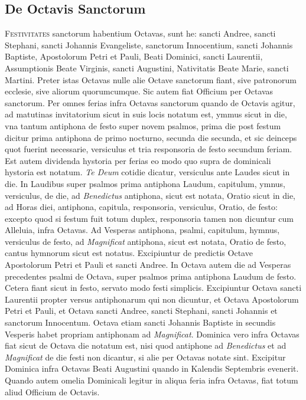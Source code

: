 \documentclass[11pt,openany]{book}
\newcommand*\zallmancaps{\usefont{U}{Zallman}{xl}{n}}
\newcommand{\ubsubsection}[2]{%
	\subsection*{#1}%
	\phantomsection%
	\addcontentsline{toc}{subsection}{#1}%
	\hypertarget{#2}{}%
}
\begin{document}
\begin{multicols*}{2}
{\color{Red} \ubsubsection{De Octavis Sanctorum}{ordinarium-de-octavis-sanctorum}}
\lettrine[lines=2]{\zallmancaps \color{Blue} F}{estivitates} sanctorum habentium Octavas, sunt he: sancti Andree, sancti Stephani, sancti Johannis Evangeliste, sanctorum Innocentium, sancti Johannis Baptiste, Apostolorum Petri et Pauli, Beati Dominici, sancti Laurentii, Assumptionis Beate Virginis, sancti Augustini, Nativitatis Beate Marie, sancti Martini.
Preter istas Octavas nulle alie Octave sanctorum fiant, sive patronorum ecclesie, sive aliorum quorumcumque. Sic autem fiat Officium per Octavas sanctorum.
Per omnes ferias infra Octavas sanctorum quando de Octavis agitur, ad matutinas invitatorium sicut in suis locis notatum est, ymmus sicut in die, vna tantum antiphona de festo super novem psalmos, prima die post festum dicitur prima antiphona de primo nocturno, secunda die secunda, et sic deinceps quot fuerint necessarie, versiculus et tria responsoria de festo secundum feriam. Est autem dividenda hystoria per ferias eo modo quo supra de dominicali hystoria est notatum. \textit{Te Deum} cotidie dicatur, versiculus ante Laudes sicut in die.
In Laudibus super psalmos prima antiphona Laudum, capitulum, ymnus, versiculus, de die, ad \textit{Benedictus} antiphona, sicut est notata, Oratio sicut in die, ad Horas diei, antiphona, capitula, responsoria, versiculus, Oratio, de festo: excepto quod si festum fuit totum duplex, responsoria tamen non dicuntur cum Alleluia, infra Octavas. Ad Vesperas antiphona, psalmi, capitulum, hymnus, versiculus de festo, ad \textit{Magnificat} antiphona, sicut est notata, Oratio de festo, cantus hymnorum sicut est notatus. Excipiuntur de predictis Octave Apostolorum Petri et Pauli et sancti Andree. In Octava autem die ad Vesperas precedentes psalmi de Octava, super psalmos prima antiphona Laudum de festo. Cetera fiant sicut in festo, servato modo festi simplicis. Excipiuntur Octava sancti Laurentii propter versus antiphonarum qui non dicuntur, et Octava Apostolorum Petri et Pauli, et Octava sancti Andree, sancti Stephani, sancti Johannis et sanctorum Innocentum.
Octava etiam sancti Johannis Baptiste in secundis Vesperis habet propriam antiphonam ad \textit{Magnificat}. Dominica vero infra Octavas fiat sicut de Octava die notatum est, nisi quod antiphone ad \textit{Benedictus} et ad \textit{Magnificat} de die festi non dicantur, si alie per Octavas notate sint. Excipitur Dominica infra Octavas Beati Augustini quando in Kalendis Septembris evenerit.
Quando autem omelia Dominicali legitur in aliqua feria infra Octavas, fiat totum aliud Officium de Octavis.


\end{multicols*}
\end{document}
